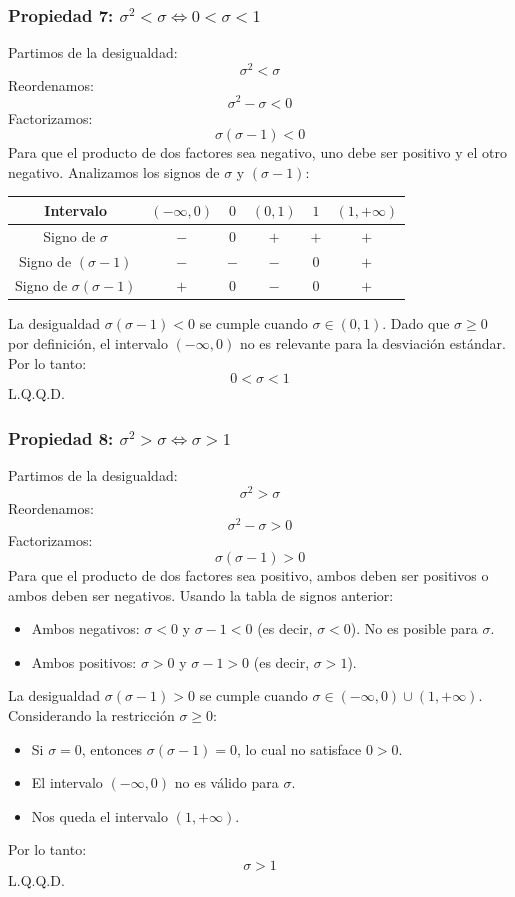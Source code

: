 \documentclass[12pt, letterpaper]{article}
\begin{document}
\subsubsection{Propiedad 7: \texorpdfstring{$\sigma^2 < \sigma \iff 0 < \sigma < 1$}{sigma-cuadrado < sigma <=> 0 < sigma < 1}}
Partimos de la desigualdad:
\[\sigma^2 < \sigma \]
Reordenamos:
\[\sigma^2-\sigma < 0 \]
Factorizamos:
\[\sigma(\sigma-1) < 0 \]
Para que el producto de dos factores sea negativo, uno debe ser positivo y el otro negativo. Analizamos los signos de $\sigma$ y $(\sigma-1)$:
\begin{center}
	\begin{tabular}{c|ccccc}
		Intervalo                   & $(-\infty, 0)$ & $0$ & $(0, 1)$ & $1$ & $(1, +\infty)$ \\
		\hline
		Signo de $\sigma$           & $-$            & $0$ & $+$      & $+$ & $+$            \\
		Signo de $(\sigma-1)$       & $-$            & $-$ & $-$      & $0$ & $+$            \\
		\hline
		Signo de $\sigma(\sigma-1)$ & $+$            & $0$ & $-$      & $0$ & $+$            \\
	\end{tabular}
\end{center}
La desigualdad $\sigma(\sigma-1) < 0$ se cumple cuando $\sigma \in (0, 1)$.
Dado que $\sigma \ge 0$ por definición, el intervalo $(-\infty, 0)$ no es relevante para la desviación estándar.
Por lo tanto:
\[0 < \sigma < 1 \]
L.Q.Q.D.

\subsubsection{Propiedad 8: \texorpdfstring{$\sigma^2 > \sigma \iff \sigma > 1$}{sigma-cuadrado > sigma <=> sigma > 1}}
Partimos de la desigualdad:
\[\sigma^2 > \sigma \]
Reordenamos:
\[\sigma^2-\sigma > 0 \]
Factorizamos:
\[\sigma(\sigma-1) > 0 \]
Para que el producto de dos factores sea positivo, ambos deben ser positivos o ambos deben ser negativos. Usando la tabla de signos anterior:
\begin{itemize}
	\item Ambos negativos: $\sigma < 0$ y $\sigma-1 < 0$ (es decir, $\sigma < 0$). No es posible para $\sigma$.
	\item Ambos positivos: $\sigma > 0$ y $\sigma-1 > 0$ (es decir, $\sigma > 1$).
\end{itemize}
La desigualdad $\sigma(\sigma-1) > 0$ se cumple cuando $\sigma \in (-\infty, 0) \cup (1, +\infty)$.
Considerando la restricción $\sigma \ge 0$:
\begin{itemize}
	\item Si $\sigma=0$, entonces $\sigma(\sigma-1)=0$, lo cual no satisface $0>0$.
	\item El intervalo $(-\infty,0)$ no es válido para $\sigma$.
	\item Nos queda el intervalo $(1, +\infty)$.
\end{itemize}
Por lo tanto:
\[\sigma > 1\]
L.Q.Q.D.
\newpage
\end{document}
